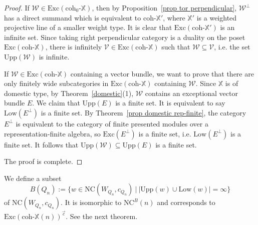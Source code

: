 \documentclass[a4paper, 11pt, reqno]{amsart}
\numberwithin{equation}{section}
\theoremstyle{remark}
\theoremstyle{definition}
\begin{document}
\begin{proof}
   If $\mathcal W \in \mathrm{Exc}(\mathrm{coh}_0 \text{-} \mathbb X)$, then by Proposition~\ref{prop tor perpendicular}, $\mathcal W^{\perp}$ has a direct summand which is equivalent to $\mathrm{coh} \text{-} \mathbb X'$, where $\mathbb X'$ is a weighted projective line of a smaller weight type. It is clear that $\mathrm{Exc}(\mathrm{coh} \text{-} \mathbb X')$ is an infinite set. Since taking right perpendicular category is a duality on the poset $\mathrm{Exc}(\mathrm{coh} \text{-} \mathbb X)$, there is infinitely $\mathcal V \in \mathrm{Exc}(\mathrm{coh} \text{-} \mathbb X)$ such that $\mathcal W \subseteq \mathcal V$, i.e. the set $\mathrm{Upp}(\mathcal W)$ is infinite.

   If $\mathcal W \in \mathrm{Exc}(\mathrm{coh} \text{-} \mathbb X)$ containing a vector bundle, we want to prove that there are only finitely wide subcategories in $\mathrm{Exc}(\mathrm{coh} \text{-} \mathbb X)$ containing $\mathcal W$. Since $\mathbb X$ is of domestic type, by Theorem~\ref{domestic}(1), $\mathcal W$ contains an exceptional vector bundle $E$. We claim that $\mathrm{Upp}(E)$ is a finite set. %
   It is equivalent to say $\mathrm{Low}(E^{\perp})$ is a finite set. By Theorem~\ref{prop domestic rep-finite}, the category $E^{\perp}$ is equivalent to the category of finite presented modules over a representation-finite algebra, so $\mathrm{Exc}(E^{\perp})$ is a finite set, i.e. $\mathrm{Low}(E^{\perp})$ is a finite set. It follows that $\mathrm{Upp}(\mathcal W) \subseteq \mathrm{Upp}(E)$ is a finite set.

   The proof is complete.
\end{proof}

We define a subset 
\[B(Q_n):=\{w \in \mathrm{NC}(W_{Q_n},c_{Q_n}) \ | \ |\mathrm{Upp}(w) \cup \mathrm{Low}(w)|=\infty \}\]
of $\mathrm{NC}(W_{Q_n},c_{Q_n})$. It is isomorphic to $\mathrm{NC}^B(n)$ and corresponds to $\mathrm{Exc}(\mathrm{coh} \text{-} \mathbb X(n))^{\vec c}$. See the next theorem.
\end{document}
